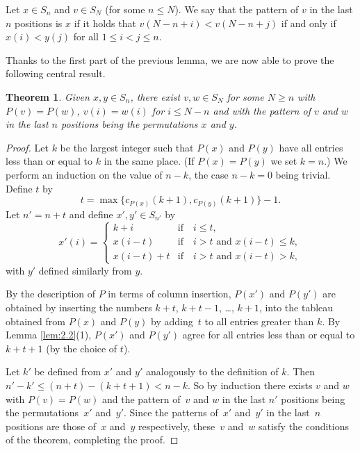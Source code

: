 \documentclass[pdftex]{sigma}
\numberwithin{equation}{section}
\newtheorem{Theorem}{Theorem}[section]
\begin{document}
Let $x\in S_n$ and $v\in S_N$ (for some $n\leq N$). We say that the pattern of $v$ in the last $n$ positions is $x$ if it holds that $v(N-n+i)<v(N-n+j)$ if and only if $x(i)<y(j)$ for all $1\leq i<j\leq n$.

Thanks to the first part of the previous lemma, we are now able to prove the following central result.

\begin{Theorem}\label{thm:asyouwish}
Given $x,y\in S_n$, there exist $v,w\in S_N$ for some $N\geq n$ with $P(v)=P(w)$, $v(i)=w(i)$ for $i\leq N-n$ and with the pattern of $v$ and $w$ in the last $n$ positions being the permutations $x$ and $y$.
\end{Theorem}
\begin{proof}Let $k$ be the largest integer such that $P(x)$ and $P(y)$ have all entries less than or equal to $k$ in the same place. (If $P(x)=P(y)$ we set $k=n$.) We perform an induction on the value of $n-k$, the case $n-k=0$ being trivial. Define $t$ by
\[
t=\max\{c_{P(x)}(k+1), c_{P(y)}(k+1)\}-1.
\]
Let $n'=n+t$ and define $x',y'\in S_{n'}$ by{\samepage
\begin{equation}\label{eq:prime}
x'(i)=\begin{cases}
k+i & \mbox{if}\quad i\leq t,\\
x(i-t) & \mbox{if}\quad i>t \mbox{ and } x(i-t)\leq k, \\
x(i-t)+t &\mbox{if}\quad i>t \mbox{ and } x(i-t)>k,
\end{cases}
\end{equation}
with $y'$ defined similarly from $y$.}


By the description of $P$ in terms of column insertion, $P(x')$ and $P(y')$ are obtained by inserting the numbers $k+t$, $k+t-1$, \dots, $k+1$, into the tableau obtained from $P(x)$ and $P(y)$ by adding~$t$ to all entries greater than $k$. By Lemma \ref{lem:2.2}(1), $P(x')$ and $P(y')$ agree for all entries less than or equal to $k+t+1$ (by the choice of $t$).

Let $k'$ be defined from $x'$ and $y'$ analogously to the definition of $k$. Then $n'-k'\leq (n+t)-(k+t+1)<n-k$. So by induction there exists $v$ and $w$ with $P(v)=P(w)$ and the pattern of~$v$ and $w$ in the last $n'$ positions being the permutations~$x'$ and~$y'$. Since the patterns of~$x'$ and~$y'$ in the last~$n$ positions are those of~$x$ and~$y$ respectively, these~$v$ and~$w$ satisfy the conditions of the theorem, completing the proof.
\end{proof}
\end{document}
